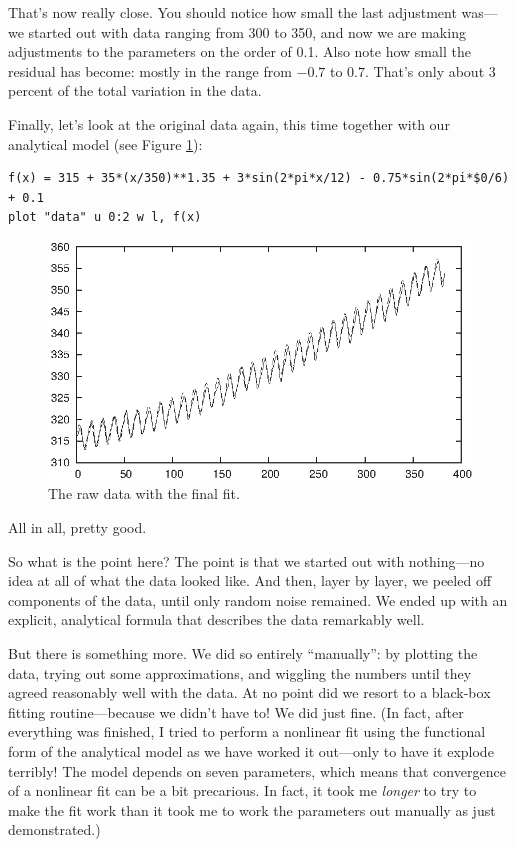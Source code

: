 That's now really close. You should notice how small the last
adjustment was---we started out with data ranging from 300 to 350, and
now we are making adjustments to the parameters on the order of 0.1.
Also note how small the residual has become: mostly in the range from
$-0.7$ to $0.7$. That's only about 3 percent of the total variation in
the data.
    
Finally, let's look at the original data again, this time together
with our analytical model (see Figure \ref{fig:session13}):

\begin{verbatim}
f(x) = 315 + 35*(x/350)**1.35 + 3*sin(2*pi*x/12) - 0.75*sin(2*pi*$0/6) + 0.1
plot "data" u 0:2 w l, f(x)
\end{verbatim}

\begin{figure}[t!]
  \centerline{\includegraphics{img/session13}}
  \caption{The raw data with the final fit.}
  \label{fig:session13}
\end{figure}
    
All in all, pretty good.
    
So what is the point here? The point is that we started out with
nothing---no idea at all of what the data looked like. And then, layer
by layer, we peeled off components of the data, until only random
noise remained. We ended up with an explicit, analytical formula that
describes the data remarkably well.
    
But there is something more. We did so entirely ``manually'': by
plotting the data, trying out some approximations, and wiggling the
numbers until they agreed reasonably well with the data. At no point
did we resort to a black-box fitting routine---because we didn't have
to!  We did just fine. (In fact, after everything was finished, I tried
to perform a nonlinear fit using the functional form of the analytical
model as we have worked it out---only to have it explode terribly!
The model depends on seven parameters, which means that convergence of
a nonlinear fit can be a bit precarious.  In fact, it took me
\emph{longer} to try to make the fit work than it took me to work the
parameters out manually as just demonstrated.)
    
